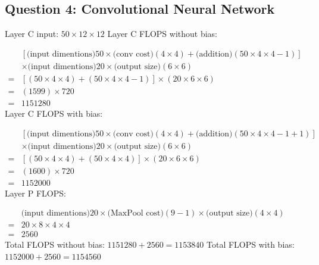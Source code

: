 \documentclass{article}
\begin{document}
\subsection*{Question 4: Convolutional Neural Network}
Layer C input: $50 \times 12 \times 12$\newline
Layer C FLOPS without bias:

$\begin{aligned}
&[\text{(input dimentions)}50 \times \text{(conv cost)}(4 \times 4) + \text{(addition)}(50 \times 4 \times 4 - 1)]\\
&\times \text{(input dimentions)}20 \times \text{(output size)}(6 \times 6)\\
= & [(50 \times 4 \times 4) + (50 \times 4 \times 4 - 1)] \times (20 \times 6 \times 6)\\
= & (1599) \times 720\\
= & 1151280
\end{aligned}$\newline
Layer C FLOPS with bias:

$\begin{aligned}
&[\text{(input dimentions)}50 \times \text{(conv cost)}(4 \times 4) + \text{(addition)}(50 \times 4 \times 4 - 1 + 1)]\\
&\times \text{(input dimentions)}20 \times \text{(output size)}(6 \times 6)\\
= & [(50 \times 4 \times 4) + (50 \times 4 \times 4)] \times (20 \times 6 \times 6)\\
= & (1600) \times 720\\
= & 1152000
\end{aligned}$\newline
Layer P FLOPS:

$\begin{aligned}
&\text{(input dimentions)}20 \times \text{(MaxPool cost)}(9-1) \times \text{(output size)}(4 \times 4)\\
= & 20 \times 8 \times 4 \times 4\\
= & 2560
\end{aligned}$\newline\newline\newline
Total FLOPS without bias: $1151280 + 2560 = 1153840$\newline
Total FLOPS with bias: $1152000 + 2560 = 1154560$\newpage
\end{document}
